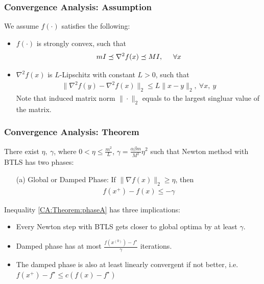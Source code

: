 \documentclass{beamer}
\begin{document}
\begin{frame}
    \frametitle{Convergence Analysis: Assumption}    
        We assume $f(\cdot)$ satisfies the following:
        \begin{itemize}
            \item $f(\cdot)$ is strongly convex, such that
    \begin{align}
        m I \preceq \nabla^2 f(x) \preceq M I, \hspace{0.5cm}\forall x
    \end{align}
\item $\nabla^2 f(x)$ is $L$-Lipschitz with constant $L > 0$, such that
    \begin{align}
        \| \nabla^2_{}f(y)  - \nabla^2_{}f(x) \|_2 \leq L \|x-y\|_2,\ 
        \forall x,\ y
    \end{align}
        Note that induced matrix norm $\| \cdot \|_2$ equals to the largest
        singluar value of the matrix.
        \end{itemize}
\end{frame}

\begin{frame}
    \frametitle{Convergence Analysis: Theorem}    
    \begin{theorem}[Part I]
        There exist $\eta,\ \gamma$, where $ 0 < \eta \leq \frac{m^2}{L}$,
        $\gamma = \frac{\alpha \beta m}{M^2}\eta^2$
        such that Newton method with BTLS has two phases: 
        \begin{itemize}
            \item[(a)] Global or Damped Phase: If $\|\nabla f(x)\|_2 \geq \eta$, then 
                \begin{align}
                    f(x^{+}) - f(x) \leq -\gamma %
                    \label{CA:Theorem:phaseA}
                \end{align}
        \end{itemize}
    \end{theorem}
        Inequality \eqref{CA:Theorem:phaseA} has three implications: 
        \begin{itemize}
            \item Every Newton step with BTLS gets closer to global optima by
                at least $\gamma$.
            \item Damped phase has at most $\frac{f(x^{(0)}) -
                    f^{\star}}{\gamma}$ iterations.
            \item The damped phase is also at least linearly convergent if not better, i.e. $f(x^{+}) - f^\star \leq c(f(x)-f^\star)$
            
        \end{itemize}
\end{frame}
\end{document}
